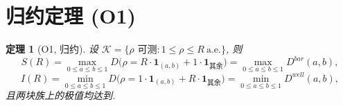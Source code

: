 \documentclass[UTF8]{ctexart}
\newtheorem{theorem}{定理}[section]
\begin{document}
\section{归约定理 (O1)}

\begin{theorem}[O1, 归约]
设 $\mathcal K=\{\rho \text{ 可测}:1\le\rho\le R\ \text{a.e.}\}$, 则
\begin{equation}
	S(R)=\max_{0\le a\le b\le 1}D\bigl(\rho=R\cdot\mathbf 1_{(a,b)}+1\cdot\mathbf 1_{\text{其余}}\bigr)
	=\max_{0\le a\le b\le 1}D^{bar}(a,b),
\end{equation}
\begin{equation}
	I(R)=\min_{0\le a\le b\le 1}D\bigl(\rho=1\cdot\mathbf 1_{(a,b)}+R\cdot\mathbf 1_{\text{其余}}\bigr)
	=\min_{0\le a\le b\le 1}D^{well}(a,b),
\end{equation}
且两块族上的极值均达到.
\end{theorem}
\end{document}
